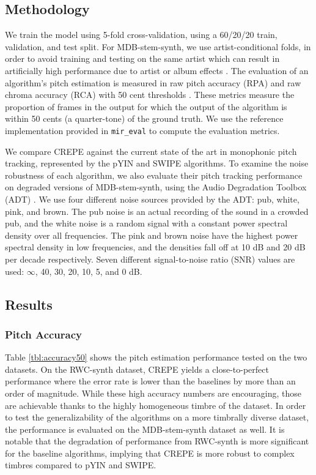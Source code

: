 \subsection{Methodology}

We train the model using 5-fold cross-validation, using a 60/20/20 train, validation, and test split.
For MDB-stem-synth, we use artist-conditional folds, in order to avoid training and testing on the same artist which can result in artificially high performance due to artist or album effects \cite{sturm2013classification}.
The evaluation of an algorithm's pitch estimation is measured in raw pitch accuracy (RPA) and raw chroma accuracy (RCA) with 50 cent thresholds \cite{salamon2014melody}.
These metrics measure the proportion of frames in the output for which the output of the algorithm is within 50 cents (a quarter-tone) of the ground truth.
We use the reference implementation provided in \texttt{mir\_eval} \cite{raffel2014mir_eval} to compute the evaluation metrics.

We compare CREPE against the current state of the art in monophonic pitch tracking, represented by the pYIN \cite{mauch2014pyin} and SWIPE \cite{camacho2008swipe} algorithms.
To examine the noise robustness of each algorithm, we also evaluate their pitch tracking performance on degraded versions of MDB-stem-synth, using the Audio Degradation Toolbox (ADT) \cite{mauch2013adt}.
We use four different noise sources provided by the ADT: pub, white, pink, and brown.
The pub noise is an actual recording of the sound in a crowded pub, 
and the white noise is a random signal with a constant power spectral density over all frequencies.
The pink and brown noise have the highest power spectral density in low frequencies, and the densities fall off at 10 dB and 20 dB per decade respectively.
Seven different signal-to-noise ratio (SNR) values are used: $\infty$, 40, 30, 20, 10, 5, and 0 dB.


\subsection{Results}

\subsubsection{Pitch Accuracy}

Table \ref{tbl:accuracy50} shows the pitch estimation performance tested on the two datasets.
On the RWC-synth dataset, CREPE yields a close-to-perfect performance where the error rate is lower than the baselines by more than an order of magnitude.
While these high accuracy numbers are encouraging, those are achievable thanks to the highly homogeneous timbre of the dataset.
In order to test the generalizability of the algorithms on a more timbrally diverse dataset, the performance is evaluated on the MDB-stem-synth dataset as well.
It is notable that the degradation of performance from RWC-synth is more significant for the baseline algorithms, implying that CREPE is more robust to complex timbres compared to pYIN and SWIPE.

